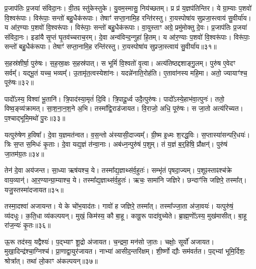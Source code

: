 प्र॒जाप॑तिः प्र॒जया॑ संविदा॒नः। 
वी॒तꣴ स्तु॑केस्तुके। 
यु॒वम॒स्मासु॒ निय॑च्छतम्। 
प्र प्र॑ य॒ज्ञप॑तिन्तिर। 
ये ग्रा॒म्याः प॒शवो॑ वि॒श्वरू॑पाः। 
विरू॑पाः॒ सन्तो॑ बहु॒धैक॑रूपाः। 
तेषाꣳ॑ सप्ता॒नामि॒ह रन्ति॑रस्तु। 
रा॒यस्पोषा॑य सुप्रजा॒स्त्वाय॑ सु॒वीर्या॑य। 
य आ॑र॒ण्याः प॒शवो॑ वि॒श्वरू॑पाः। 
विरू॑पाः॒ सन्तो॑ बहु॒धैक॑रूपाः। 
वा॒युस्ताꣳ अग्रे॒ प्रमु॑मोक्तु दे॒वः। 
प्र॒जाप॑तिः प्र॒जया॑ संविदा॒नः। 
इडा॑यै सृ॒प्तं घृ॒तव॑च्चराच॒रम्। 
दे॒वा अन्व॑विन्द॒न्गुहा॑ हि॒तम्। 
य आ॑र॒ण्याः प॒शवो॑ वि॒श्वरू॑पाः। 
विरू॑पाः॒ सन्तो॑ बहु॒धैक॑रूपाः। 
तेषाꣳ॑ सप्ता॒नामि॒ह रन्ति॑रस्तु। 
रा॒यस्पोषा॑य सुप्रजा॒स्त्वाय॑ सु॒वीर्या॑य॥३१॥
\anuvakamend[आ॒त्मा जना॑नां  विकु॒र्वन्तं॑  विप॒श्चिं प्र॒जानां᳚ वसु॒धानीं᳚  वि॒राजं॒ चर॑न्तं॒  गोम॑तीं मे॒ निय॑च्छ॒त्वेक॑चक्रं॒ व्यो॑मन्मा॒यया॑ दे॒व एक॑रूपा अ॒ष्टौ च॑]

स॒हस्र॑शीर्\mbox{}षा॒ पुरु॑षः। 
स॒ह॒स्रा॒क्षः स॒हस्र॑पात्। 
स भूमिं॑ वि॒श्वतो॑ वृ॒त्वा। 
अत्य॑तिष्ठद्दशाङ्गु॒लम्। 
पुरु॑ष ए॒वेदꣳ सर्वम्᳚। 
यद्भू॒तं यच्च॒ भव्यम्᳚। 
उ॒तामृ॑त॒त्वस्येशा॑नः। 
यदन्ने॑नाति॒रोह॑ति। 
ए॒तावा॑नस्य महि॒मा। 
अतो॒ ज्यायाꣳ॑श्च॒ पूरु॑षः॥३२॥

पादो᳚ऽस्य॒ विश्वा॑ भू॒तानि॑। 
त्रि॒पाद॑स्या॒मृतं॑ दि॒वि। 
त्रि॒पादू॒र्ध्व उदै॒त्पुरु॑षः। 
पादो᳚ऽस्ये॒हाभ॑वा॒त्पुनः॑। 
ततो॒ विष्व॒ङ्व्य॑क्रामत्। 
सा॒श॒ना॒न॒श॒ने अ॒भि। 
तस्मा᳚द्वि॒राड॑जायत। 
वि॒राजो॒ अधि॒ पूरु॑षः। 
स जा॒तो अत्य॑रिच्यत। 
प॒श्चाद्भूमि॒मथो॑ पु॒रः॥३३॥

यत्पुरु॑षेण ह॒विषा᳚। 
दे॒वा य॒ज्ञमत॑न्वत। 
व॒स॒न्तो अ॑स्यासी॒\-दाज्यम्᳚। 
ग्री॒ष्म इ॒ध्मः  श॒रद्ध॒विः। 
स॒प्तास्या॑सन्परि॒\-धयः॑। 
त्रिः स॒प्त स॒मिधः॑ कृ॒ताः। 
दे॒वा यद्य॒ज्ञं त॑न्वा॒नाः। 
अब॑ध्न॒न्पुरु॑षं प॒शुम्। 
तं य॒ज्ञं ब॒र्॒‌हिषि॒ प्रौक्षन्॑। 
पुरु॑षं जा॒तम॑ग्र॒तः॥३४॥

तेन॑ दे॒वा अय॑जन्त। 
सा॒ध्या ऋष॑यश्च॒ ये। 
तस्मा᳚द्य॒ज्ञाथ्स॑र्व॒हुतः॑। 
सम्भृ॑तं पृषदा॒ज्यम्। 
प॒शूꣴस्ताꣴश्च॑क्रे वाय॒व्यान्॑। 
आ॒र॒ण्यान्ग्रा॒म्याश्च॒ ये। 
तस्मा᳚द्य॒ज्ञाथ्स॑र्व॒हुतः॑। 
ऋचः॒ सामा॑नि जज्ञिरे। 
छन्दाꣳ॑सि जज्ञिरे॒ तस्मा᳚त्। 
यजु॒स्तस्मा॑दजायत॥३५॥

तस्मा॒दश्वा॑ अजायन्त। 
ये के चो॑भ॒याद॑तः। 
गावो॑ ह जज्ञिरे॒ तस्मा᳚त्। 
तस्मा᳚ज्जा॒ता अ॑जा॒वयः॑। 
यत्पुरु॑षं॒ व्य॑दधुः। 
क॒ति॒धा व्य॑कल्पयन्। 
मुखं॒ किम॑स्य॒ कौ बा॒हू। 
कावू॒रू पादा॑वुच्येते। 
ब्रा॒ह्म॒णो᳚ऽस्य॒ मुख॑मासीत्। 
बा॒हू रा॑ज॒न्यः॑ कृ॒तः॥३६॥

ऊ॒रू तद॑स्य॒ यद्वैश्यः॑। 
प॒द्भ्याꣳ शू॒द्रो अ॑जायत। 
च॒न्द्रमा॒ मन॑सो जा॒तः। 
चक्षोः॒ सूर्यो॑ अजायत। 
मुखा॒दिन्द्र॑श्चा॒ग्निश्च॑। 
प्रा॒णाद्वा॒युर॑जायत। 
नाभ्या॑ आसीद॒न्तरि॑क्षम्। 
शी॒र्ष्णो द्यौः सम॑वर्तत। 
प॒द्भ्यां भूमि॒र्दिशः॒ श्रोत्रा᳚त्। 
तथा॑ लो॒काꣳ अ॑कल्पयन्॥३७॥

